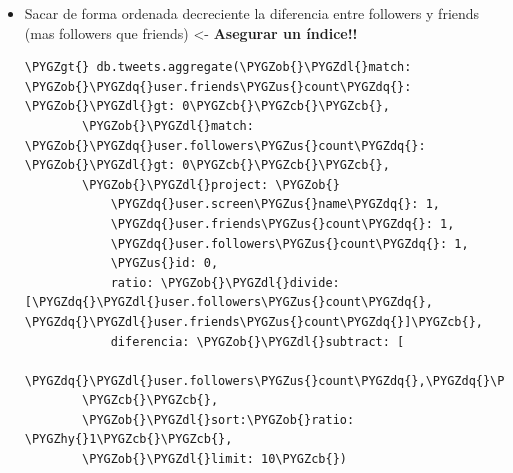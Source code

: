 \documentclass[a4paper,10pt,english]{sphinxmanual}
\def\PYGZus{\char`\_}
\def\PYGZob{\char`\{}
\def\PYGZcb{\char`\}}
\def\PYGZgt{\char`\>}
\def\PYGZdl{\char`\$}
\def\PYGZhy{\char`\-}
\def\PYGZdq{\char`\"}
\begin{document}
\begin{itemize}
\begin{enumerate}
\begin{Verbatim}[commandchars=\\\{\}]
\PYGZob{} \PYGZdq{}\PYGZus{}id\PYGZdq{} : 1, \PYGZdq{}avg\PYGZdq{} : 8.044204413696619 \PYGZcb{}
\end{Verbatim}

\item {} 
Who is closest to the average? ...

\end{enumerate}

\item {} 
Sacar de forma ordenada decreciente la diferencia entre followers
y friends (mas followers que friends) \textless{}- \textbf{Asegurar un índice!!}

\begin{Verbatim}[commandchars=\\\{\}]
\PYGZgt{} db.tweets.aggregate(\PYGZob{}\PYGZdl{}match: \PYGZob{}\PYGZdq{}user.friends\PYGZus{}count\PYGZdq{}: \PYGZob{}\PYGZdl{}gt: 0\PYGZcb{}\PYGZcb{}\PYGZcb{},
        \PYGZob{}\PYGZdl{}match: \PYGZob{}\PYGZdq{}user.followers\PYGZus{}count\PYGZdq{}: \PYGZob{}\PYGZdl{}gt: 0\PYGZcb{}\PYGZcb{}\PYGZcb{},
        \PYGZob{}\PYGZdl{}project: \PYGZob{}
            \PYGZdq{}user.screen\PYGZus{}name\PYGZdq{}: 1,
            \PYGZdq{}user.friends\PYGZus{}count\PYGZdq{}: 1,
            \PYGZdq{}user.followers\PYGZus{}count\PYGZdq{}: 1,
            \PYGZus{}id: 0,
            ratio: \PYGZob{}\PYGZdl{}divide:[\PYGZdq{}\PYGZdl{}user.followers\PYGZus{}count\PYGZdq{}, \PYGZdq{}\PYGZdl{}user.friends\PYGZus{}count\PYGZdq{}]\PYGZcb{},
            diferencia: \PYGZob{}\PYGZdl{}subtract: [
                \PYGZdq{}\PYGZdl{}user.followers\PYGZus{}count\PYGZdq{},\PYGZdq{}\PYGZdl{}user.friends\PYGZus{}count\PYGZdq{}]\PYGZcb{}
        \PYGZcb{}\PYGZcb{},
        \PYGZob{}\PYGZdl{}sort:\PYGZob{}ratio: \PYGZhy{}1\PYGZcb{}\PYGZcb{},
        \PYGZob{}\PYGZdl{}limit: 10\PYGZcb{})


\end{Verbatim}
\end{itemize}
\end{document}
